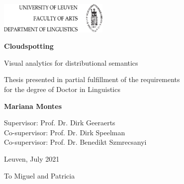 


\thispagestyle{empty}
\begin{titlepage}
    \flushright
    \includegraphics[height=15mm]{assets/img/faculty_logo.png}
        
        
    \begin{center}
        \vspace*{4cm}
        \Huge
        \textbf{Cloudspotting}
            
        \vspace{0.5cm}
        \LARGE
        Visual analytics for distributional semantics
            
        \vfill
        
        \large  
        Thesis presented in partial fulfillment of the requirements\\
        for the degree of Doctor in Linguistics
        \vspace{0.8cm}
            
        \textbf{Mariana Montes}
            
        \vspace{1.5cm}
            
        Supervisor: Prof. Dr. Dirk Geeraerts\\
        Co-supervisor: Prof. Dr. Dirk Speelman\\
        Co-supervisor: Prof. Dr. Benedikt Szmrecsanyi\\
            
        \vspace{3cm}
            
        Leuven, July 2021
            
    \end{center}
\end{titlepage}

\thispagestyle{empty}

\newpage
\thispagestyle{empty}
\mbox{}
\newpage

\thispagestyle{empty}
\begin{dedication}
To Miguel and Patricia
\end{dedication}

\newpage
\thispagestyle{empty}
\mbox{}
\newpage
\frontmatter
